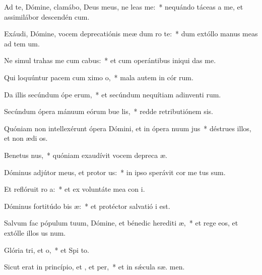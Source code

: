 \item Ad te, Dómine, clamábo, Deus meus, ne leas  me:~* nequándo táceas a me, et assimilábor descendén  cum.
\item Exáudi, Dómine, vocem deprecatiónis meæ dum ro  te:~* dum extóllo manus meas ad tem  um.
\item Ne simul trahas me cum cabus:~* et cum operántibus iniqui  das me.
\item Qui loquúntur pacem cum ximo o,~* mala autem in cór rum.
\item Da illis secúndum ópe erum,~* et secúndum nequítiam adinventi rum.
\item Secúndum ópera mánuum eórum bue lis,~* redde retributiónem  sis.
\item Quóniam non intellexérunt ópera Dómini, et in ópera nuum jus~* déstrues illos, et non ædi os.
\item Benetus nus,~* quóniam exaudívit vocem depreca æ.
\item Dóminus adjútor meus, et protor us:~* in ipso sperávit cor me  tus sum.
\item Et reflóruit ro a:~* et ex voluntáte mea con i.
\item Dóminus fortitúdo bis æ:~* et protéctor salvatió  i est.
\item Salvum fac pópulum tuum, Dómine, et bénedic herediti æ,~* et rege eos, et extólle illos us  num.
\item Glória tri, et o,~* et Spi to.
\item Sicut erat in princípio, et , et per,~* et in sǽcula sæ. men.
